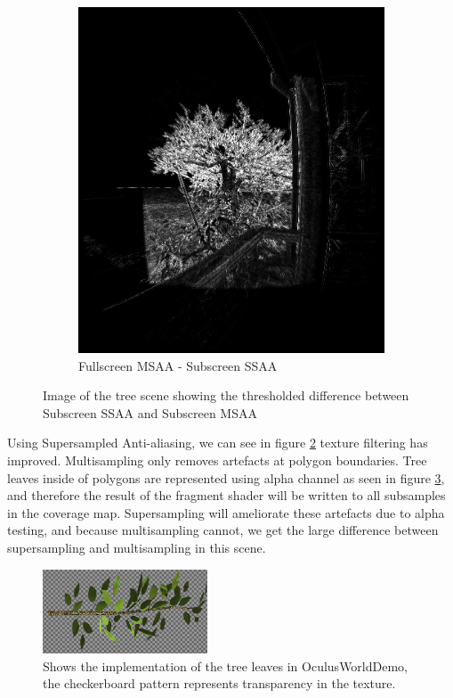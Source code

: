 \documentclass[12pt,a4paper,twoside,openright]{report}
\begin{document}
\begin{figure}[h]
\begin{subfigure}{0.5\textwidth}
\centerline{\includegraphics[width=0.9\linewidth]{figs/difftree.png}}
\caption{Fullscreen MSAA - Subscreen SSAA}
\label{ssaatree}
\end{subfigure}
 
\caption{Image of the tree scene showing the thresholded difference between Subscreen SSAA and Subscreen MSAA}
\label{fig:supersample}
\end{figure}

\noindent Using Supersampled Anti-aliasing, we can see in figure \ref{fig:supersample} texture filtering has improved. Multisampling only removes artefacts at polygon boundaries. Tree leaves inside of polygons are represented using alpha channel as seen in figure \ref{fig:alphaleaves}, and therefore the result of the fragment shader will be written to all subsamples in the coverage map. Supersampling will ameliorate these artefacts due to alpha testing, and because multisampling cannot, we get the large difference between supersampling and multisampling in this scene.

\begin{figure}[tbh]
\begin{centering}
\includegraphics[height=2.5cm]{figs/alpaleaves.png}
\caption{Shows the implementation of the tree leaves in OculusWorldDemo, the checkerboard pattern represents transparency in the texture.}
\label{fig:alphaleaves}
\end{centering}
\end{figure}
\end{document}
